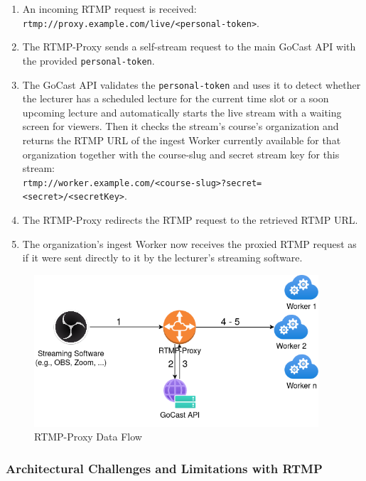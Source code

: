 \begin{enumerate}
    \item An incoming \ac{RTMP} request is received:\\
    \texttt{rtmp://proxy.example.com/live/<personal-token>}.
    \item The RTMP-Proxy sends a self-stream request to the main GoCast \ac{API} with the provided \texttt{personal-token}.
    \item The GoCast \ac{API} validates the \texttt{personal-token} and uses it to detect whether the lecturer has a scheduled lecture for the current time slot or a soon upcoming lecture and automatically starts the live stream with a waiting screen for viewers. Then it checks the stream's course's organization and returns the \ac{RTMP} URL of the ingest Worker currently available for that organization together with the course-slug and secret stream key for this stream: \\ 
    \texttt{rtmp://worker.example.com/<course-slug>?secret=<secret>/<secretKey>}.
    \item The RTMP-Proxy redirects the \ac{RTMP} request to the retrieved \ac{RTMP} URL.
    \item The organization's ingest Worker now receives the proxied \ac{RTMP} request as if it were sent directly to it by the lecturer's streaming software.
\end{enumerate}

\begin{figure}[htpb]
    \centering
    \includegraphics[width=300pt]{images/RtmpProxy.png}
    \caption[RTMP-Proxy Flow]{RTMP-Proxy Data Flow}\label{fig:rtmp-proxy}
\end{figure}

\subsubsection{Architectural Challenges and Limitations with RTMP}

